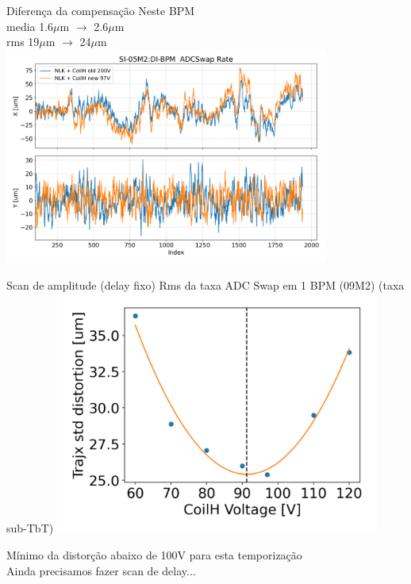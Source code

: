 \documentclass[1611]{beamer}            %
\begin{document}
\begin{frame}{Diferença da compensação}
\centering
    Neste BPM \\
    media 1.6$\mu$m $\to$ 2.6$\mu$m\\
    rms 19$\mu$m $\to$ 24$\mu$m
    \includegraphics[width=0.8\textwidth]{2024-05-10/figures/nlk_and_coilh_old_new.png}
\end{frame}

\begin{frame}{Scan de amplitude (delay fixo)}
\centering
    Rms da taxa ADC Swap em 1 BPM (09M2) (taxa sub-TbT)
    \centering
    \includegraphics[width=0.8\textwidth]{2024-05-10/figures/voltage_scan_adcrate.png}

    Mínimo da distorção abaixo de 100V para esta temporização \\
    Ainda precisamos fazer scan de delay...
\end{frame}
\end{document}
